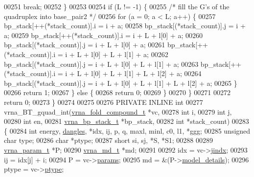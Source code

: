 \begin{DoxyCode}
00251         \textcolor{keywordflow}{break};
00252     \}
00253 
00254     \textcolor{keywordflow}{if} (L != -1) \{
00255       \textcolor{comment}{/* fill the G's of the quadruplex into base\_pair2 */}
00256       \textcolor{keywordflow}{for} (a = 0; a < L; a++) \{
00257         bp\_stack[++(*stack\_count)].i  = i + a;
00258         bp\_stack[(*stack\_count)].j    = i + a;
00259         bp\_stack[++(*stack\_count)].i  = i + L + l[0] + a;
00260         bp\_stack[(*stack\_count)].j    = i + L + l[0] + a;
00261         bp\_stack[++(*stack\_count)].i  = i + L + l[0] + L + l[1] + a;
00262         bp\_stack[(*stack\_count)].j    = i + L + l[0] + L + l[1] + a;
00263         bp\_stack[++(*stack\_count)].i  = i + L + l[0] + L + l[1] + L + l[2] + a;
00264         bp\_stack[(*stack\_count)].j    = i + L + l[0] + L + l[1] + L + l[2] + a;
00265       \}
00266       \textcolor{keywordflow}{return} 1;
00267     \} \textcolor{keywordflow}{else} \{
00268       \textcolor{keywordflow}{return} 0;
00269     \}
00270   \}
00271 
00272   \textcolor{keywordflow}{return} 0;
00273 \}
00274 
00275 
00276 PRIVATE INLINE \textcolor{keywordtype}{int}
00277 vrna\_BT\_gquad\_int(\hyperlink{group__fold__compound_structvrna__fc__s}{vrna\_fold\_compound\_t}  *vc,
00278                   \textcolor{keywordtype}{int}                   i,
00279                   \textcolor{keywordtype}{int}                   j,
00280                   \textcolor{keywordtype}{int}                   en,
00281                   \hyperlink{group__data__structures_structvrna__bp__stack__s}{vrna\_bp\_stack\_t}       *bp\_stack,
00282                   \textcolor{keywordtype}{int}                   *stack\_count)
00283 \{
00284   \textcolor{keywordtype}{int}           energy, \hyperlink{group__model__details_ga72b511ed1201f7e23ec437e468790d74}{dangles}, *idx, ij, p, q, maxl, minl, c0, l1, *ggg;
00285   \textcolor{keywordtype}{unsigned} \textcolor{keywordtype}{char} type;
00286   \textcolor{keywordtype}{char}          *ptype;
00287   \textcolor{keywordtype}{short}         si, sj, *S, *S1;
00288 
00289   \hyperlink{group__energy__parameters_structvrna__param__s}{vrna\_param\_t}  *P;
00290   \hyperlink{group__model__details_structvrna__md__s}{vrna\_md\_t}     *md;
00291 
00292   idx     = vc->\hyperlink{group__fold__compound_a5037235dee512efd85ca543780bbca1a}{jindx};
00293   ij      = idx[j] + i;
00294   P       = vc->\hyperlink{group__fold__compound_a19b8720c2c5321c1b97c830bd17566ea}{params};
00295   md      = &(P->\hyperlink{group__energy__parameters_a7b84353eb9075c595bad4ceb871bcae7}{model\_details});
00296   ptype   = vc->\hyperlink{group__fold__compound_a3fbea559f1d1976b2d67c215cdeee0b2}{ptype};

\end{DoxyCode}
